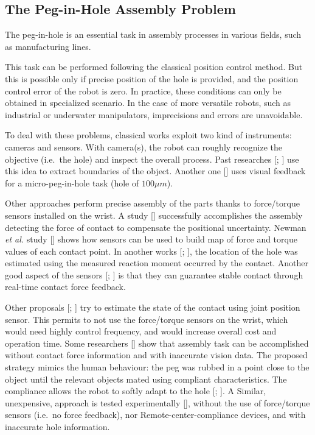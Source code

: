 \subsection{The Peg-in-Hole Assembly Problem}
The peg-in-hole is an essential task in assembly processes in various fields, such as manufacturing lines.

This task can be performed following the classical position control method. But this is possible only if precise position of the hole is provided, and the position control error of the robot is zero.
In practice, these conditions can only be obtained in specialized scenario. In the case of more versatile robots, such as industrial or underwater manipulators, 
imprecisions and errors are unavoidable.

To deal with these problems, classical works exploit two kind of instruments: cameras and sensors. 
With camera(s), the robot can roughly recognize the objective (i.e.\ the hole) and inspect the overall process. Past researches [\cite{IntroPeg2}; \cite{IntroPeg1}] use this idea to extract boundaries of the object. Another one [\cite{IntroPeg3}] uses visual feedback for a micro-peg-in-hole task (hole of $100 \mu m$).

Other approaches perform precise assembly of the parts thanks to force/torque sensors installed on the wrist. A study [\cite{IntroPeg4}] successfully accomplishes the assembly detecting the force of contact to compensate the positional uncertainty. Newman \textit{et al.} study [\cite{IntroPeg7}] shows how sensors can be used to build map of force and torque values of each contact point.  
In another works [\cite{IntroPeg9}; \cite{IntroPeg8}], the location of the hole was estimated using the measured reaction moment occurred by the contact.
Another good aspect of the sensors [\cite{IntroPeg6}; \cite{IntroPeg5}] is that they can guarantee stable contact through real-time contact force feedback.

Other proposals [\cite{IntroPeg10}; \cite{IntroPeg11}] try to estimate the state of the contact using joint position sensor. This permits to not use the force/torque sensors on the wrist, which would need highly control frequency, and would increase overall cost and operation time. 
Some researchers [\cite{IntroPeg12}] show that assembly task can be accomplished without contact force information and with inaccurate vision data. The proposed strategy  mimics the human behaviour: the peg was rubbed in a point close to the object until the relevant objects mated using compliant characteristics. The compliance allows the robot to softly adapt to the hole [\cite{IntroPeg13}; \cite{IntroPeg14}].
A Similar, unexpensive, approach is tested experimentally [\cite{IntroPeg15}], without the use of force/torque sensors (i.e.\ no force feedback), nor Remote-center-compliance devices, and with inaccurate hole information.




